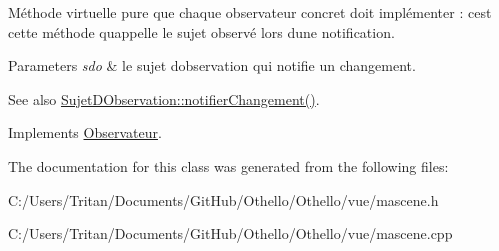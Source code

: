 Méthode virtuelle pure que chaque observateur concret doit implémenter \+: c\textquotesingle{}est cette méthode qu\textquotesingle{}appelle le sujet observé lors d\textquotesingle{}une notification. 


\begin{DoxyParams}{Parameters}
{\em sdo} & le sujet d\textquotesingle{}observation qui notifie un changement. \\
\hline
\end{DoxyParams}
\begin{DoxySeeAlso}{See also}
\hyperlink{class_sujet_d_observation_ab4a833d911377a2dd3c83ce8ce3ac540}{Sujet\+D\+Observation\+::notifier\+Changement()}. 
\end{DoxySeeAlso}


Implements \hyperlink{class_observateur_a4fcbecba73ee923d201246207b8470ce}{Observateur}.



The documentation for this class was generated from the following files\+:\begin{DoxyCompactItemize}
\item 
C\+:/\+Users/\+Tritan/\+Documents/\+Git\+Hub/\+Othello/\+Othello/vue/mascene.\+h\item 
C\+:/\+Users/\+Tritan/\+Documents/\+Git\+Hub/\+Othello/\+Othello/vue/mascene.\+cpp\end{DoxyCompactItemize}

